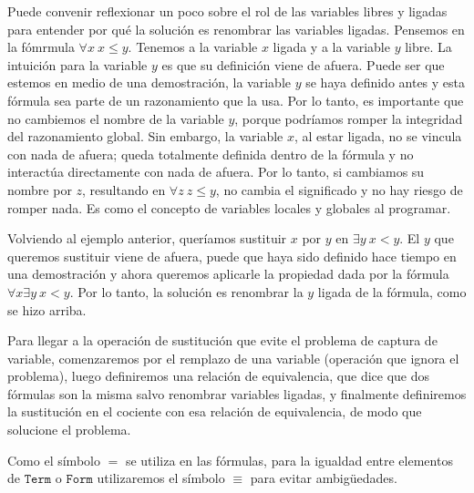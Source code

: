 \documentclass[a4paper, 12pt]{report}
\theoremstyle{definition}
\begin{document}
Puede convenir reflexionar un poco sobre el rol de las variables libres y ligadas para entender por qué la solución es renombrar las variables ligadas. Pensemos en la fómrmula $\forall x~ x\leq y$. Tenemos a la variable $x$ ligada y a la variable $y$ libre. La intuición para la variable $y$ es que su definición viene de afuera. Puede ser que estemos en medio de una demostración, la variable $y$ se haya definido antes y esta fórmula sea parte de un razonamiento que la usa. Por lo tanto, es importante que no cambiemos el nombre de la variable $y$, porque podríamos romper la integridad del razonamiento global. Sin embargo, la variable $x$, al estar ligada, no se vincula con nada de afuera; queda totalmente definida dentro de la fórmula y no interactúa directamente con nada de afuera. Por lo tanto, si cambiamos su nombre por $z$, resultando en $\forall z~ z\leq y$, no cambia el significado y no hay riesgo de romper nada. Es como el concepto de variables locales y globales al programar.

Volviendo al ejemplo anterior, queríamos sustituir $x$ por $y$ en $\exists y~ x<y$. El $y$ que queremos sustituir viene de afuera, puede que haya sido definido hace tiempo en una demostración y ahora queremos aplicarle la propiedad dada por la fórmula $\forall x\exists y~ x<y$. Por lo tanto, la solución es renombrar la $y$ ligada de la fórmula, como se hizo arriba.

Para llegar a la operación de sustitución que evite el problema de captura de variable, comenzaremos por el remplazo de una variable (operación que ignora el problema), luego definiremos una relación de equivalencia, que dice que dos fórmulas son la misma salvo renombrar variables ligadas, y finalmente definiremos la sustitución en el cociente con esa relación de equivalencia, de modo que solucione el problema.

Como el símbolo $=$ se utiliza en las fórmulas, para la igualdad entre elementos de $\mathtt{Term}$ o $\mathtt{Form}$ utilizaremos el símbolo $\equiv$ para evitar ambigüedades.
\end{document}
